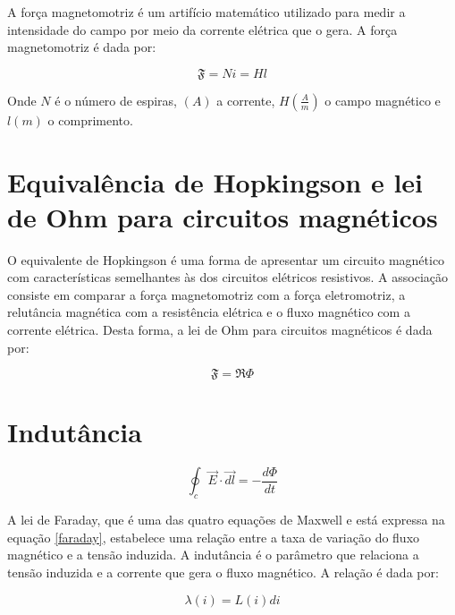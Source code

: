 \documentclass[12pt,fleqn]{book} %
\begin{document}
{\begin{definition}
\end{definition}

\begin{definition} A força magnetomotriz é um artifício matemático utilizado para medir a intensidade do campo por meio da corrente elétrica que o gera. A força magnetomotriz é dada por:

\begin{equation}
\mathfrak{F} = Ni = Hl
\end{equation}

Onde $N$ é o número de espiras, $(A)$ a corrente, $H(\frac{A}{m})$ o campo magnético e $l(m)$ o comprimento. 

\end{definition}

\section{Equivalência de Hopkingson e lei de Ohm para circuitos magnéticos}

O equivalente de Hopkingson é uma forma de apresentar um circuito magnético com características semelhantes às dos circuitos elétricos resistivos. A associação consiste em comparar a força magnetomotriz com a força eletromotriz, a relutância magnética com a resistência elétrica e o fluxo magnético com a corrente elétrica. Desta forma, a lei de Ohm para circuitos magnéticos é dada por:

\begin{equation}
\mathfrak{F} = \mathfrak{R}\Phi
\end{equation}


\section{Indutância}

\begin{equation}\label{faraday}
\oint_c \vec{E}\cdot\vec{dl} = -\frac{d\Phi}{dt}
\end{equation}

A lei de Faraday, que é uma das quatro equações de Maxwell e está expressa na equação \ref{faraday}, estabelece uma relação entre a taxa de variação do fluxo magnético e a tensão induzida. A indutância é o parâmetro que relaciona a tensão induzida e a corrente que gera o fluxo magnético. A relação é dada por:

\begin{equation}\label{lambdai}
\lambda(i) = L(i)di
\end{equation}

}
\end{document}
